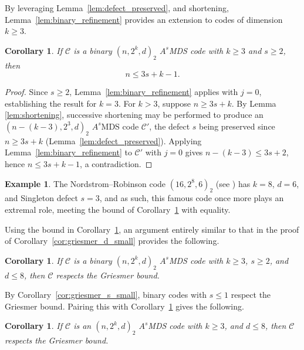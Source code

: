 \documentclass[12pt, letterpaper]{article}
\theoremstyle{plain}
\newtheorem{corollary}[theorem]{Corollary}
\theoremstyle{definition}
\newtheorem{example}[theorem]{Example}
\newcommand{\mc}[1]{\mathcal{#1}}
\begin{document}
	By leveraging Lemma~\ref{lem:defect_preserved}, and shortening, Lemma~\ref{lem:binary_refinement} provides an extension to codes of dimension $k \ge 3$.
	
	\begin{corollary}\label{cor:binary_refinement_general}
		If $\mathcal{C}$ is a binary $(n, 2^k, d)_2$ $A^s$MDS code with $k \ge 3$ and $s \ge 2$, then
		\[
		n \le 3s + k - 1.
		\]
	\end{corollary}
	
	\begin{proof}
		Since $s \ge 2$, Lemma~\ref{lem:binary_refinement} applies with $j=0$, establishing the result for $k=3$. For $k>3$, suppose $n \ge 3s+k$.  By Lemma \ref{lem:shortening}, successive shortening may be performed to produce an $(n-(k-3), 2^3, d)_2$ $A^s$MDS code $\mathcal{C}'$, the defect $s$ being preserved since $n \ge 3s+k$ (Lemma~\ref{lem:defect_preserved}). Applying Lemma~\ref{lem:binary_refinement} to $\mathcal{C}'$ with $j=0$ gives $n-(k-3) \le 3s+2$, hence $n \le 3s+k-1$, a contradiction.
	\end{proof}
	
	\begin{example}\label{ex:NR}
		The Nordstrom--Robinson code $(16, 2^8, 6)_2$ 	(see \cite{NordstromRobinson1967, MacWilliamsSloane1977}) has $k=8$, $d=6$, and Singleton defect $s = 3$, and as such, this famous code once more plays an extremal role, meeting the bound of Corollary~\ref{cor:binary_refinement_general} with equality.
	\end{example}
	
	
	Using the bound in Corollary~\ref{cor:binary_refinement_general}, an argument entirely similar to that in the proof of Corollary~\ref{cor:griesmer_d_small} provides the following.
	\begin{corollary}\label{cor:GBbinary_s2}
	If $\mathcal{C}$ is a binary $(n, 2^k, d)_2$ $A^s$MDS code with $k \ge 3$, $s \ge 2$, and $d\le 8$, then $\mc{C}$ respects the Griesmer bound.
	\end{corollary}
	
	By Corollary~\ref{cor:griesmer_s_small}, binary codes with $s\le1$ respect the Griesmer bound. Pairing this with Corollary~\ref{cor:GBbinary_s2} gives the following.
	\begin{corollary}\label{cor:binary_d8_griesmer}
	 If $\mc{C}$ is an $(n, 2^k, d)_2$ $A^s$MDS code with $k\ge 3$, and  $d\le 8$, then $\mc{C}$ respects the Griesmer bound.
	\end{corollary}
\end{document}
